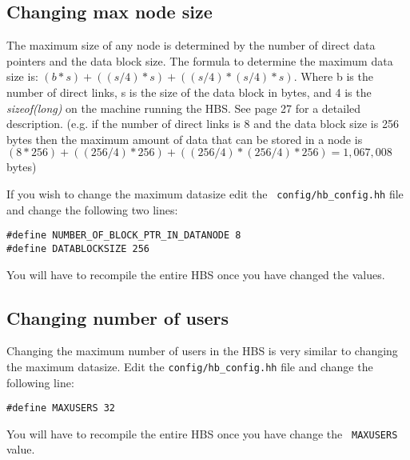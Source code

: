 \subsection{Changing max node size}

The maximum size of any node is determined by the number of direct data
pointers and the data block size.  The formula to determine the maximum data
size is: $(b*s) + ((s/4) * s) + ((s/4) * (s/4) * s)$.  Where b is the
number of direct links, s is the size of the data block in bytes, and 4 is
the {\em sizeof(long)} on the machine running the HBS. See \cite{Wiil90a}
page 27 for a detailed description. (e.g. if the number of direct links is
8 and the data block size is 256 bytes then the maximum amount of data that
can be stored in a node is $(8 * 256) + ((256/4) * 256) + ((256/4) *
(256/4) * 256) = 1,067,008$ bytes)

If you wish to change the maximum datasize edit the {\tt
config/hb\_config.hh} file and change the following two lines:\small
\begin{verbatim}#define NUMBER_OF_BLOCK_PTR_IN_DATANODE 8
#define DATABLOCKSIZE 256
\end{verbatim}
\normalsize
You will have to recompile the entire HBS once you have changed the values.

\subsection{Changing number of users}

Changing the maximum number of users in the HBS is very similar to changing
the maximum datasize.  Edit the {\tt config/hb\_config.hh} file and change
the following line:

\small 
\begin{verbatim}
#define MAXUSERS 32
\end{verbatim}
\normalsize 

You will have to recompile the entire HBS once you have change the {\tt
MAXUSERS} value.

